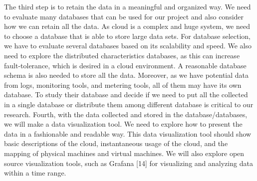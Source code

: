   The third step is to retain the data in a meaningful and organized way. We need to evaluate many databases that can be used for our project and also consider how we can retain all the data. As cloud is a complex and huge system, we need to choose a database that is able to store large data sets. For database selection, we have to evaluate several databases based on its scalability and speed. We also need to explore the distributed characteristics databases, as this can increase fault-tolerance, which is desired in a cloud environment. A reasonable database schema is also needed to store all the data. Moreover, as we have potential data from logs, monitoring tools, and metering tools, all of them may have its own database. To study their database and decide if we need to put all the collected in a single database or distribute them among different database is critical to our research. 
  Fourth, with the data collected and stored in the database/databases, we will make a data visualization tool. We need to explore how to present the data in a fashionable and readable way. This data visualization tool should show basic descriptions of the cloud, instantaneous usage of the cloud, and the mapping of physical machines and virtual machines. We will also explore open source visualization tools, such as Grafana [14] for visualizing and analyzing data within a time range. 


